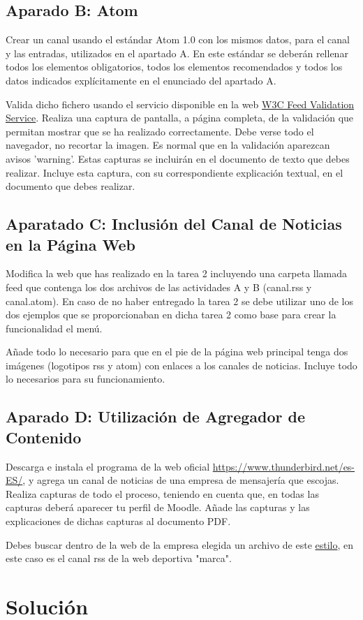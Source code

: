 \subsection{Aparado B: Atom}
Crear un canal usando el estándar Atom 1.0 con los mismos datos, para el canal y las entradas, utilizados en el apartado A. En este estándar se deberán rellenar todos los elementos obligatorios, todos los elementos recomendados y todos los datos indicados explícitamente en el enunciado del apartado A.

Valida dicho fichero usando el servicio disponible en la web \href{https://validator.w3.org/feed/#validate_by_input}{W3C Feed Validation Service}. Realiza una captura de pantalla, a página completa, de la validación que permitan mostrar que se ha realizado correctamente. Debe verse todo el navegador, no recortar la imagen. Es normal que en la validación aparezcan avisos 'warning'. Estas capturas se incluirán en el documento de texto que debes realizar. Incluye esta captura, con su correspondiente explicación textual, en el documento que debes realizar.

\subsection{Aparatado C: Inclusión del Canal de Noticias en la Página Web}
Modifica la web que has realizado en la tarea 2 incluyendo una carpeta llamada feed que contenga los dos archivos de las actividades A y B (canal.rss y canal.atom). En caso de no haber entregado la tarea 2 se debe utilizar uno de los dos ejemplos que se proporcionaban en dicha tarea 2 como base para crear la funcionalidad el menú.

Añade todo lo necesario para que en el pie de la página web principal tenga dos imágenes (logotipos rss y atom) con enlaces a los canales de noticias. Incluye todo lo necesarios para su funcionamiento.

\subsection{Aparado D: Utilización de Agregador de Contenido}
Descarga e instala el programa de la web oficial \url{https://www.thunderbird.net/es-ES/}, y  agrega un canal de noticias de una empresa de mensajería que escojas. Realiza capturas de todo el proceso, teniendo en cuenta que, en todas las capturas deberá aparecer tu perfil de Moodle. Añade las capturas y las explicaciones de dichas capturas al documento PDF.

Debes buscar dentro de la web de la empresa elegida un archivo de este \href{https://e00-marca.uecdn.es/rss/portada.xml}{estilo}, en este caso es el canal rss de la web deportiva "marca".

\section{Solución}


\newpage




